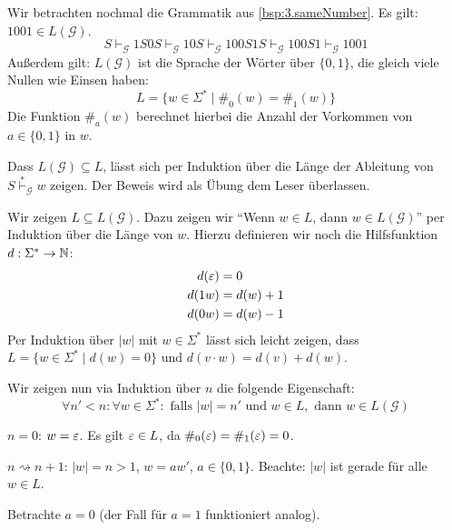 
\begin{Bsp}Wir betrachten nochmal die Grammatik aus \autoref{bsp:3.sameNumber}.
Es gilt: $1001\in L(\mathcal{G})$.
$$ S 
\vdash_\mathcal{G} 1S0S
\vdash_\mathcal{G} 10S
\vdash_\mathcal{G} 100S1S
\vdash_\mathcal{G} 100S1
\vdash_\mathcal{G} 1001
$$
Außerdem gilt: $L(\mathcal{G})$ ist die Sprache der Wörter über $\{0,1\}$, die gleich viele Nullen wie Einsen haben:
  \begin{displaymath}
    L = \{ w \in \Sigma^* \mid \#_0(w) = \#_1(w)\}
  \end{displaymath}
  Die Funktion $\#_a(w)$ berechnet hierbei die Anzahl der Vorkommen von $a \in \{0, 1\}$ in $w$.

  Dass $L(\mathcal{G}) \subseteq L$, lässt sich per Induktion über die Länge der Ableitung von $S \stackrel{*}{\vdash}_\mathcal{G} w$ zeigen.
  Der Beweis wird als Übung dem Leser überlassen.

  Wir zeigen $L \subseteq L(\mathcal{G})$.
  Dazu zeigen wir "`Wenn $w \in L$, dann $w \in L(\mathcal{G})$"' per Induktion über die Länge von $w$.
  Hierzu definieren wir noch die Hilfsfunktion $d : \Sigma^* \to \mathbb{N}$:
  \begin{align*}
    d(\varepsilon) &= 0 \\
    d(1w) &= d(w) + 1 \\
    d(0w) &= d(w) - 1
  \end{align*}
  Per Induktion über $|w|$ mit $w \in \Sigma^*$ lässt sich leicht zeigen, dass $L = \{w \in \Sigma^* \mid d(w) = 0\}$ und $d(v \cdot w) = d(v) + d(w)$.
  
Wir zeigen nun via Induktion über $n$ die folgende Eigenschaft:
$$\forall n' < n: \forall w \in \Sigma^*: \text{ falls } |w| = n' \text{ und } w \in L, \text{ dann } w \in L(\mathcal{G})$$

\begin{description}[font=\normalfont]
\item[I.A.:] $n = 0$: $w = \varepsilon$. Es gilt $\varepsilon \in L$, da $\#_0(\varepsilon) = \#_1(\varepsilon) = 0$.
\item[I.S.:] $n \rightsquigarrow n+1$: $|w| = n > 1$, $w = aw'$, $a \in \{0,1\}$.
  Beachte: $|w|$ ist gerade für alle $w \in L$.

  Betrachte $a = 0$ (der Fall für $a = 1$ funktioniert analog).


\end{description}
\end{Bsp}
